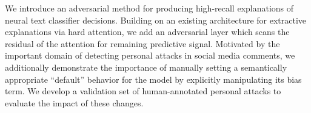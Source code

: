 We introduce an adversarial method for producing high-recall explanations of neural text classifier decisions. Building on an existing architecture for extractive explanations via hard attention, we add an adversarial layer which scans the residual of the attention for remaining predictive signal. Motivated by the important domain of detecting personal attacks in social media comments, we additionally demonstrate the importance of manually setting a semantically appropriate ``default'' behavior for the model by explicitly manipulating its bias term. We develop a validation set of human-annotated personal attacks to evaluate the impact of these changes.
